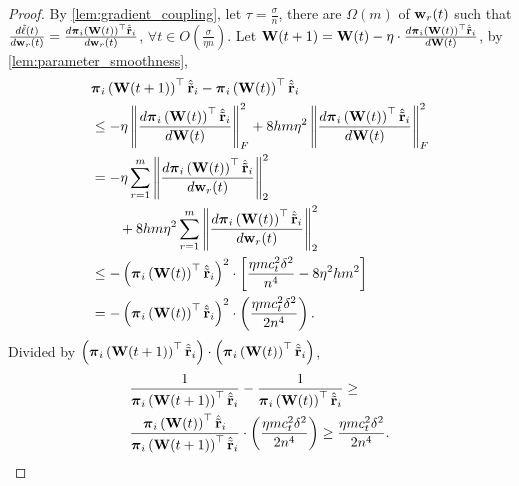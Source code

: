 \begin{proof}
    By \cref{lem:gradient_coupling}, let $\tau = \frac{\sigma}{n}$, there are $\Omega\left( m \right)$ of ${\mathbf{w}}_r(t)$ such that $\frac{d\tilde{\ell}(t)}{d {\mathbf{w}}_r(t)} = \frac{d {\boldsymbol{\pi}}_i\left( {\mathbf{W}}(t) \right)^\top \hat{{\tilde{\mathbf{r}}}}_i}{d {\mathbf{w}}_r(t)}$, $\forall t \in O\left( \frac{\sigma}{\eta n} \right)$. Let ${\mathbf{W}}(t+1) = {\mathbf{W}}(t) - \eta \cdot \frac{d {\boldsymbol{\pi}}_i\left( {\mathbf{W}}(t) \right)^\top \hat{{\tilde{\mathbf{r}}}}_i}{d {\mathbf{W}}(t)}$, by \cref{lem:parameter_smoothness},
\begin{equation*}
\begin{split}
    &{\boldsymbol{\pi}}_i\left( {\mathbf{W}}(t+1) \right)^\top \hat{{\tilde{\mathbf{r}}}}_i - {\boldsymbol{\pi}}_i\left( {\mathbf{W}}(t) \right)^\top \hat{{\tilde{\mathbf{r}}}}_i \\
    &\le - \eta \left\| \frac{d {\boldsymbol{\pi}}_i\left( {\mathbf{W}}(t) \right)^\top \hat{{\tilde{\mathbf{r}}}}_i}{d {\mathbf{W}}(t)} \right\|_F^2 + 8 h m \eta^2 \left\| \frac{d {\boldsymbol{\pi}}_i\left( {\mathbf{W}}(t) \right)^\top \hat{{\tilde{\mathbf{r}}}}_i}{d {\mathbf{W}}(t)} \right\|_F^2 \\
    &= - \eta \sum\limits_{r=1}^{m}{ \left\| \frac{d {\boldsymbol{\pi}}_i\left( {\mathbf{W}}(t) \right)^\top \hat{{\tilde{\mathbf{r}}}}_i}{d {\mathbf{w}}_r(t)} \right\|_2^2 } \\
    &\qquad + 8 h m \eta^2 \sum\limits_{r=1}^{m}{ \left\| \frac{d {\boldsymbol{\pi}}_i\left( {\mathbf{W}}(t) \right)^\top \hat{{\tilde{\mathbf{r}}}}_i}{d {\mathbf{w}}_r(t)} \right\|_2^2 } \\
    &\le - \left( {\boldsymbol{\pi}}_i\left( {\mathbf{W}}(t) \right)^\top \hat{{\tilde{\mathbf{r}}}}_i \right)^2 \cdot \left[ \frac{\eta m c_t^2 \delta^2}{n^4} - 8 \eta^2 h m^2 \right] \\
    &= - \left( {\boldsymbol{\pi}}_i\left( {\mathbf{W}}(t) \right)^\top \hat{{\tilde{\mathbf{r}}}}_i \right)^2 \cdot \left( \frac{\eta m c_t^2 \delta^2}{2n^4} \right).
\end{split}
\end{equation*}
Divided by $\left( {\boldsymbol{\pi}}_i\left( {\mathbf{W}}(t+1) \right)^\top \hat{{\tilde{\mathbf{r}}}}_i\right) \cdot \left( {\boldsymbol{\pi}}_i\left( {\mathbf{W}}(t) \right)^\top \hat{{\tilde{\mathbf{r}}}}_i \right)$,
\begin{equation*}
\begin{split}
    &\frac{1}{{\boldsymbol{\pi}}_i\left( {\mathbf{W}}(t+1) \right)^\top \hat{{\tilde{\mathbf{r}}}}_i} - \frac{1}{{\boldsymbol{\pi}}_i\left( {\mathbf{W}}(t) \right)^\top \hat{{\tilde{\mathbf{r}}}}_i} \ge \\
    &\frac{{\boldsymbol{\pi}}_i\left( {\mathbf{W}}(t) \right)^\top \hat{{\tilde{\mathbf{r}}}}_i}{{\boldsymbol{\pi}}_i\left( {\mathbf{W}}(t+1) \right)^\top \hat{{\tilde{\mathbf{r}}}}_i} \cdot \left( \frac{\eta m c_t^2 \delta^2}{2n^4} \right) \ge \frac{\eta m c_t^2 \delta^2}{2n^4}.
\end{split}
\end{equation*}

\end{proof}

